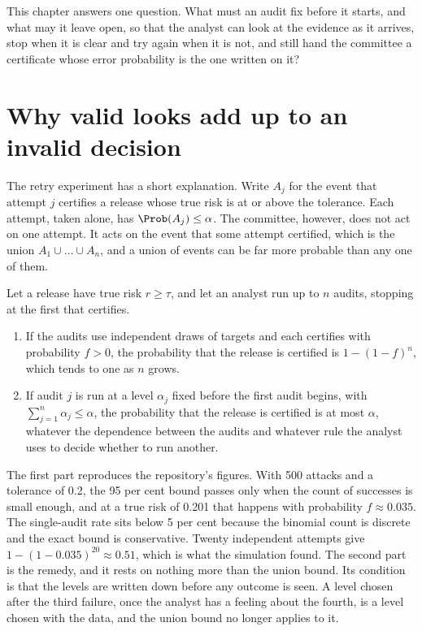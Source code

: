 This chapter answers one question. What must an audit fix before it starts, and
what may it leave open, so that the analyst can look at the evidence as it arrives,
stop when it is clear and try again when it is not, and still hand the committee a
certificate whose error probability is the one written on it?

\section{Why valid looks add up to an invalid decision}\label{c06:sec-retry}

The retry experiment has a short explanation. Write $A_j$ for the event that
attempt $j$ certifies a release whose true risk is at or above the tolerance. Each
attempt, taken alone, has $\Prob(A_j) \le \alpha$. The committee, however, does not
act on one attempt. It acts on the event that some attempt certified, which is the
union $A_1 \cup \dots \cup A_n$, and a union of events can be far more probable
than any one of them.

\begin{proposition}\label{c06:prop-retry}
Let a release have true risk $r \ge \tau$, and let an analyst run up to $n$ audits,
stopping at the first that certifies.
\begin{enumerate}
\item If the audits use independent draws of targets and each certifies with
probability $f > 0$, the probability that the release is certified is
$1 - (1-f)^n$, which tends to one as $n$ grows.
\item If audit $j$ is run at a level $\alpha_j$ fixed before the first audit begins,
with $\sum_{j=1}^n \alpha_j \le \alpha$, the probability that the release is
certified is at most $\alpha$, whatever the dependence between the audits and
whatever rule the analyst uses to decide whether to run another.
\end{enumerate}
\end{proposition}

The first part reproduces the repository's figures. With 500 attacks and a
tolerance of 0.2, the 95 per cent bound passes only when the count of successes is
small enough, and at a true risk of 0.201 that happens with probability $f \approx
0.035$. The single-audit rate sits below 5 per cent because the binomial count is
discrete and the exact bound is conservative. Twenty independent attempts give
$1 - (1-0.035)^{20} \approx 0.51$, which is what the simulation found.
The second part is the remedy, and it rests on nothing more than the union bound.
Its condition is that the levels are written down before any outcome is seen. A
level chosen after the third failure, once the analyst has a feeling about the
fourth, is a level chosen with the data, and the union bound no longer applies to
it.

